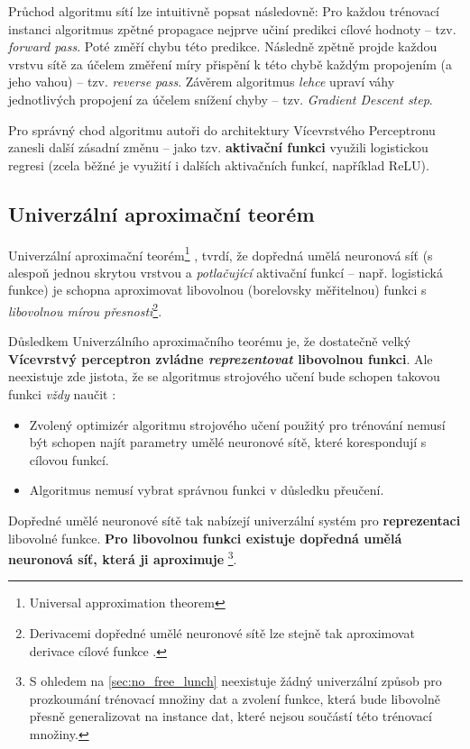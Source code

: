 Průchod algoritmu sítí lze intuitivně popsat následovně: Pro každou trénovací instanci algoritmus zpětné propagace nejprve učiní predikci cílové hodnoty – tzv. \emph{forward pass}.
Poté změří chybu této predikce. Následně zpětně projde každou vrstvu sítě za účelem změření míry přispění k této chybě každým propojením (a jeho vahou) – tzv. \emph{reverse pass}.
Závěrem algoritmus \emph{lehce} upraví váhy jednotlivých propojení za účelem snížení chyby – tzv. \emph{Gradient Descent step}. \cite{Geron2019}

Pro správný chod algoritmu autoři \cite{Rumelhart1987} do architektury Vícevrstvého Perceptronu zanesli další zásadní změnu – jako tzv. \textbf{aktivační funkci} využili logistickou regresi (zcela běžné je využití i dalších aktivačních funkcí, například ReLU).

\subsection{Univerzální aproximační teorém}
\label{sec:universal_approximation_theorem}
Univerzální aproximační teorém\footnote{Universal approximation theorem} \cite{Hornik1989}, \cite{Cybenko1989} tvrdí, že dopředná umělá neuronová síť (s alespoň jednou skrytou vrstvou a \emph{potlačující} aktivační funkcí – např. logistická funkce) je schopna aproximovat libovolnou (borelovsky měřitelnou) funkci s \emph{libovolnou mírou přesnosti}\footnote{Derivacemi dopředné umělé neuronové sítě lze stejně tak aproximovat derivace cílové funkce \cite{Hornik1990}.}.

Důsledkem Univerzálního aproximačního teorému je, že dostatečně velký \textbf{Vícevrstvý perceptron zvládne \emph{reprezentovat} libovolnou funkci}.
Ale neexistuje zde jistota, že se algoritmus strojového učení bude schopen takovou funkci \emph{vždy} naučit \cite{Goodfellow2016}:

\begin{itemize}
    \item Zvolený optimizér algoritmu strojového učení použitý pro trénování nemusí být schopen najít parametry umělé neuronové sítě, které korespondují s cílovou funkcí.
    \item Algoritmus nemusí vybrat správnou funkci v důsledku přeučení.
\end{itemize}

Dopředné umělé neuronové sítě tak nabízejí univerzální systém pro \textbf{reprezentaci} libovolné funkce. \textbf{Pro libovolnou funkci existuje dopředná umělá neuronová síť, která ji aproximuje}
\footnote{S ohledem na \autoref{sec:no_free_lunch} neexistuje žádný univerzální způsob pro prozkoumání trénovací množiny dat a zvolení funkce, která bude libovolně přesně generalizovat na instance dat, které nejsou součástí této trénovací množiny.}.